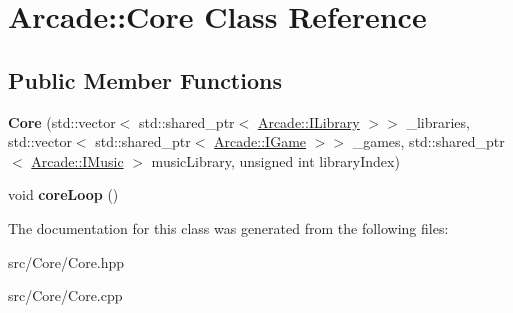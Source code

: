 \hypertarget{class_arcade_1_1_core}{}\section{Arcade\+:\+:Core Class Reference}
\label{class_arcade_1_1_core}
\subsection*{Public Member Functions}
\begin{DoxyCompactItemize}
\item 
\mbox{\label{class_arcade_1_1_core_ac917342e66c9f5e1ea6debb79a348442}} 
{\bfseries Core} (std\+::vector$<$ std\+::shared\+\_\+ptr$<$ \mbox{\hyperlink{class_arcade_1_1_i_library}{Arcade\+::\+I\+Library}} $>$$>$ \+\_\+libraries, std\+::vector$<$ std\+::shared\+\_\+ptr$<$ \mbox{\hyperlink{class_arcade_1_1_i_game}{Arcade\+::\+I\+Game}} $>$$>$ \+\_\+games, std\+::shared\+\_\+ptr$<$ \mbox{\hyperlink{class_arcade_1_1_i_music}{Arcade\+::\+I\+Music}} $>$ music\+Library, unsigned int library\+Index)
\item 
\mbox{\label{class_arcade_1_1_core_a7996e5cea3d4243c614e68a6557b1c53}} 
void {\bfseries core\+Loop} ()
\end{DoxyCompactItemize}


The documentation for this class was generated from the following files\+:\begin{DoxyCompactItemize}
\item 
src/\+Core/Core.\+hpp\item 
src/\+Core/Core.\+cpp\end{DoxyCompactItemize}
